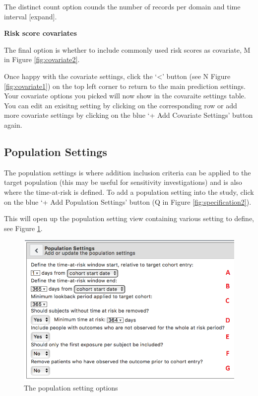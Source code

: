 \documentclass[11pt]{book}
\begin{document}
The distinct count option counds the number of records per domain and
time interval {[}expand{]}.

\textbf{Risk score covariates}

The final option is whether to include commonly used risk scores as
covariate, M in Figure \ref{fig:covariate2}.

Once happy with the covariate settings, click the `\textless{}' button
(see N Figure \ref{fig:covariate1}) on the top left corner to return to
the main prediction settings. Your covariate options you picked will now
show in the covaraite settings table. You can edit an exisitng setting
by clicking on the corresponding row or add more covariate settings by
clicking on the blue `+ Add Covariate Settings' button again.

\subsection{Population Settings}\label{population-settings}

The population settings is where addition inclusion criteria can be
applied to the target population (this may be useful for sensitivity
investigations) and is also where the time-at-risk is defined. To add a
population setting into the study, click on the blue `+ Add Population
Settings' button (Q in Figure \ref{fig:specification2}).

This will open up the population setting view containing various setting
to define, see Figure \ref{fig:figureAS19}.

\begin{figure}
\includegraphics[width=1\linewidth]{images/PatientLevelPrediction/atlasImplementation/analysis_population_settings} \caption{The population setting options}\label{fig:figureAS19}
\end{figure}
\end{document}
